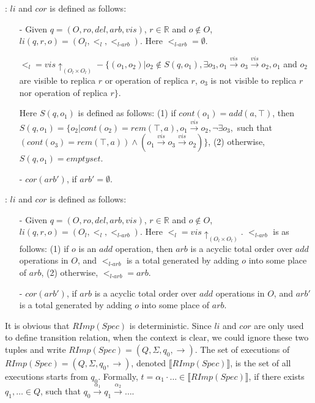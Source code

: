 : $li$ and $cor$ is defined as follows: 

\begin{itemize}
\setlength{\itemsep}{0.5pt}
\item[-] Given $q = (O,ro,del,arb,vis)$, $r \in \mathbb{R}$ and $o \notin O$, $li(q,r,o) = ( O_l ,<_l, <_{\textit{l-arb}} )$. Here $<_{\textit{l-arb}} = \emptyset$. 

$<_l = vis \uparrow_{(O_l \times O_l)} - \{ (o_1,o_2) \vert o_2 \notin S(q,o_1), \exists o_3, o_1 {\xrightarrow{vis}} o_3 {\xrightarrow{vis}} o_2, o_1$ and $o_2$ are visible to replica $r$ or operation of replica $r$, $o_3$ is not visible to replica $r$ nor operation of replica $r\}$. 

Here $S(q,o_1)$ is defined as follows: (1) if $cont(o_1)=add(a,\top)$, then $S(q,o_1) = \{o_2 \vert cont(o_2)=rem(\top,a), o_1 {\xrightarrow{vis}} o_2, \neg \exists o_3,$ such that $( cont(o_3) = rem(\top,a) ) \wedge ( o_1 {\xrightarrow{vis}} o_3 {\xrightarrow{vis}} o_2 ) \}$, (2) otherwise, $S(q,o_1) = emptyset$. 

\item[-] $cor(arb')$, if $arb'=\emptyset$. 
\end{itemize} 

: $li$ and $cor$ is defined as follows: 

\begin{itemize}
\setlength{\itemsep}{0.5pt}
\item[-] Given $q = (O,ro,del,arb,vis)$, $r \in \mathbb{R}$ and $o \notin O$, $li(q,r,o) = ( O_l ,<_l, <_{\textit{l-arb}} )$. Here $<_l = vis \uparrow_{(O_l \times O_l)}$. $<_{\textit{l-arb}}$ is as follows: (1) if $o$ is an $add$ operation, then $arb$ is a acyclic total order over $add$ operations in $O$, and $<_{\textit{l-arb}}$ is a total generated by adding $o$ into some place of $arb$, (2) otherwise, $<_{\textit{l-arb}} = arb$.

\item[-] $cor(arb')$, if $arb$ is a acyclic total order over $add$ operations in $O$, and $arb'$ is a total generated by adding $o$ into some place of $arb$. 
\end{itemize}

It is obvious that $RImp(Spec)$ is deterministic. Since $li$ and $cor$ are only used to define transition relation, when the context is clear, we could ignore these two tuples and write $RImp(Spec) = (Q,\Sigma,q_0,\rightarrow)$. The set of executions of $RImp(Spec) = (Q,\Sigma,q_0,\rightarrow)$, denoted $\llbracket RImp(Spec) \rrbracket$, is the set of all executions starts from $q_0$. Formally, $t = \alpha_1 \cdot \ldots \in \llbracket RImp(Spec) \rrbracket$, if there exists $q_1,\ldots \in Q$, such that $q_0 {\xrightarrow{\alpha_1}} q_1 {\xrightarrow{\alpha_2}} \ldots$.

